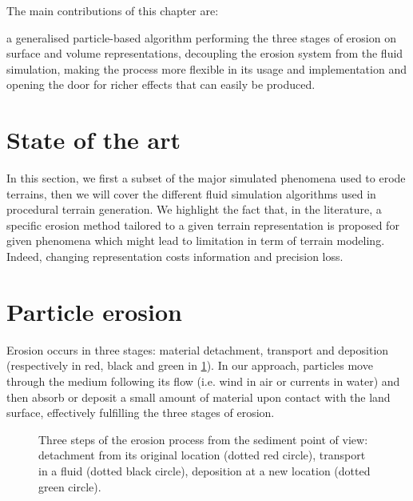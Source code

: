 The main contributions of this chapter are:
\begin{Itemize}
    \Item{} a generalised particle-based algorithm performing the three
    stages of erosion on surface and volume representations,
    \Item{} decoupling the erosion system from the fluid simulation, making the process more flexible in its usage and implementation and opening the door for richer effects that can easily be produced.
\end{Itemize}

\section{State of the art}
\label{sec:erosion-state_of_the_art}
In this section, we first a subset of the major simulated phenomena used to erode terrains, then we will cover the different fluid simulation algorithms used in procedural terrain generation. We highlight the fact that, in the literature, a specific erosion method tailored to a given terrain representation is proposed for given phenomena which might lead to limitation in term of terrain modeling. Indeed, changing representation costs information and precision loss.





\section{Particle erosion}
\label{sec:erosion-method}
Erosion occurs in three stages: material detachment, transport and deposition (respectively in red, black and green in \cref{fig:erosion-ablation_erosion}). In our approach, particles move through the medium following its flow (i.e. wind in air or currents in water) and then absorb or deposit a small amount of material upon contact with the land surface, effectively fulfilling the three stages of erosion.
\begin{figure}
\caption{Three steps of the erosion process from the sediment point of view: detachment from its original location (dotted red circle), transport in a fluid (dotted black circle), deposition at a new location (dotted green circle).}
\label{fig:erosion-ablation_erosion}

\end{figure}
